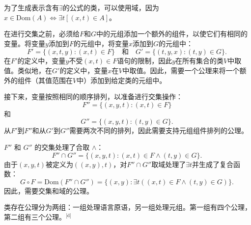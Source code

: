 为了生成表示含有\( \exists \)的公式的类，可以使用域，因为\( x \in \text{Dom}(A) \iff \exists t \left[ (x,t) \in A \right] \)。

在进行交集之前，必须给\( F \)和\( G \)中的元组添加一个额外的组件，以使它们有相同的变量。将变量\( y \)添加到\( F \)的元组中，将变量\( x \)添加到\( G \)的元组中：
\[
F' = \{ (x,t,y) : (x,t) \in F \} \quad \text{和} \quad G' = \{ (t,y,x) : (t,y) \in G \}.~
\]
在\( F' \)的定义中，变量\( y \)不受\( (x,t) \in F \)语句的限制，因此\( y \)在所有集合的类\( V \)中取值。类似地，在\( G' \)的定义中，变量\( x \)在\( V \)中取值。因此，需要一个公理来将一个额外的组件（其值范围在\( V \)中）添加到给定类的元组中。

接下来，变量按照相同的顺序排列，以准备进行交集操作：
\[
F'' = \{ (x, y, t) : (x, t) \in F \}~
\]
和
\[
G'' = \{ (x, y, t) : (t, y) \in G \}.~
\]
从\( F' \)到\( F'' \)和从\( G' \)到\( G'' \)需要两次不同的排列，因此需要支持元组组件排列的公理。

\( F'' \) 和 \( G'' \) 的交集处理了合取 \( \land \)：
\[
F'' \cap G'' = \{ (x, y, t) : (x, t) \in F \land (t, y) \in G \}.~
\]
由于\( (x, y, t) \)被定义为\( ((x, y), t) \)，对\( F'' \cap G'' \)取域处理了\( \exists t \)并生成了复合函数：
\[
G \circ F = \text{Dom}(F'' \cap G'') = \{ (x, y) : \exists t ((x, t) \in F \land (t, y) \in G) \}.~
\]
因此，需要交集和域的公理。

类存在公理分为两组：一组处理语言原语，另一组处理元组。第一组有四个公理，第二组有三个公理。\(^\text{[d]}\)